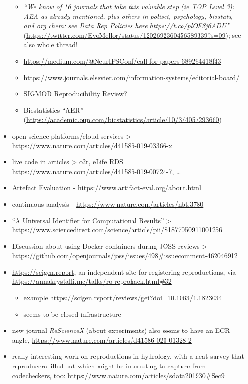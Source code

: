 \documentclass[12pt]{article}
\begin{document}
\begin{itemize}
  \begin{itemize}
  \item
    \emph{``We know of 16 journals that take this valuable step (ie TOP
    Level 3): AEA as already mentioned, plus others in polisci,
    psychology, biostats, and org chem: see Data Rep Policies here
    \url{https://t.co/plOF8j6ADU}''}
    (\url{https://twitter.com/EvoMellor/status/1202692360456589339?s=09});
    see also whole thread!
  \item
    \url{https://medium.com/@NeurIPSConf/call-for-papers-689294418f43}
  \item
    \url{https://www.journals.elsevier.com/information-systems/editorial-board/}
  \item
    SIGMOD Reproducibility Review?
  \item
    Biostatistics ``AER''
    (\url{https://academic.oup.com/biostatistics/article/10/3/405/293660})
  \end{itemize}
\item
  open science platforms/cloud services \textgreater{}
  \url{https://www.nature.com/articles/d41586-019-03366-x}
\item
  live code in articles \textgreater{} o2r, eLife RDS
  \url{https://www.nature.com/articles/d41586-019-00724-7}, \ldots{}
\item
  Artefact Evaluation - \url{https://www.artifact-eval.org/about.html}
\item
  continuous analysis - \url{https://www.nature.com/articles/nbt.3780}
\item
  ``A Universal Identifier for Computational Results'' \textgreater{}
  \url{https://www.sciencedirect.com/science/article/pii/S1877050911001256}
\item
  Discussion about using Docker containers during JOSS reviews
  \textgreater{}
  \url{https://github.com/openjournals/joss/issues/498\#issuecomment-462046912}
\item
  \url{https://scigen.report}, an independent site for registering
  reproductions, via
  \url{https://annakrystalli.me/talks/ro-reprohack.html\#32}

  \begin{itemize}
  \item
    example
    \url{https://scigen.report/reviews/get?doi=10.1063/1.1823034}
  \item
    seems to be closed infrastructure
  \end{itemize}
\item
  new journal \emph{ReScienceX} (about experiments) also seems to have
  an ECR angle, \url{https://www.nature.com/articles/d41586-020-01328-2}
\item
  really interesting work on reproductions in hydrology, with a neat
  survey that reproducers filled out which might be interesting to
  capture from codecheckers, too:
  \url{https://www.nature.com/articles/sdata201930\#Sec9}
\end{itemize}
\end{document}
